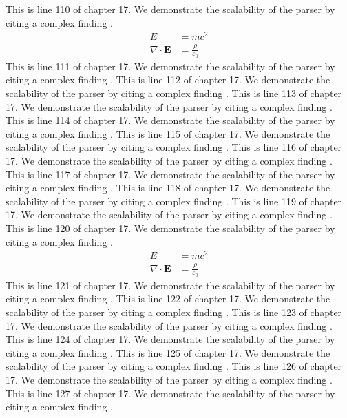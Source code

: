This is line 110 of chapter 17. We demonstrate the scalability of the parser by citing a complex finding \cite{ref17_110}.
\begin{align*}
  E &= mc^2 \\
  \nabla \cdot \mathbf{E} &= \frac{\rho}{\varepsilon_0}
\end{align*}
This is line 111 of chapter 17. We demonstrate the scalability of the parser by citing a complex finding \cite{ref17_111}.
This is line 112 of chapter 17. We demonstrate the scalability of the parser by citing a complex finding \cite{ref17_112}.
This is line 113 of chapter 17. We demonstrate the scalability of the parser by citing a complex finding \cite{ref17_113}.
This is line 114 of chapter 17. We demonstrate the scalability of the parser by citing a complex finding \cite{ref17_114}.
This is line 115 of chapter 17. We demonstrate the scalability of the parser by citing a complex finding \cite{ref17_115}.
This is line 116 of chapter 17. We demonstrate the scalability of the parser by citing a complex finding \cite{ref17_116}.
This is line 117 of chapter 17. We demonstrate the scalability of the parser by citing a complex finding \cite{ref17_117}.
This is line 118 of chapter 17. We demonstrate the scalability of the parser by citing a complex finding \cite{ref17_118}.
This is line 119 of chapter 17. We demonstrate the scalability of the parser by citing a complex finding \cite{ref17_119}.
This is line 120 of chapter 17. We demonstrate the scalability of the parser by citing a complex finding \cite{ref17_120}.
\begin{align*}
  E &= mc^2 \\
  \nabla \cdot \mathbf{E} &= \frac{\rho}{\varepsilon_0}
\end{align*}
This is line 121 of chapter 17. We demonstrate the scalability of the parser by citing a complex finding \cite{ref17_121}.
This is line 122 of chapter 17. We demonstrate the scalability of the parser by citing a complex finding \cite{ref17_122}.
This is line 123 of chapter 17. We demonstrate the scalability of the parser by citing a complex finding \cite{ref17_123}.
This is line 124 of chapter 17. We demonstrate the scalability of the parser by citing a complex finding \cite{ref17_124}.
This is line 125 of chapter 17. We demonstrate the scalability of the parser by citing a complex finding \cite{ref17_125}.
This is line 126 of chapter 17. We demonstrate the scalability of the parser by citing a complex finding \cite{ref17_126}.
This is line 127 of chapter 17. We demonstrate the scalability of the parser by citing a complex finding \cite{ref17_127}.
